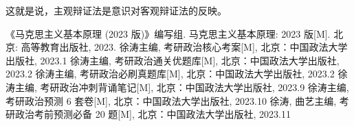 \documentclass[utf-8, 10pt]{article}
\begin{document}
这就是说，主观辩证法是意识对客观辩证法的反映。

\begin{thebibliography}{1}
    《马克思主义基本原理 (2023 版)》编写组. 马克思主义基本原理: 2023 版[M].
    北京: 高等教育出版社, 2023.
    徐涛主编, 考研政治核心考案[M], 北京：中国政法大学出版社, 2023.1
    徐涛主编, 考研政治通关优题库[M], 北京：中国政法大学出版社, 2023.2
    徐涛主编, 考研政治必刷真题库[M], 北京：中国政法大学出版社, 2023.2
    徐涛主编, 考研政治冲刺背诵笔记[M], 北京：中国政法大学出版社, 2023.9
    徐涛主编, 考研政治预测 6 套卷[M], 北京：中国政法大学出版社, 2023.10
    徐涛, 曲艺主编, 考研政治考前预测必备 20 题[M], 北京：中国政法大学出版社, 2023.11
\end{thebibliography}
\end{document}
